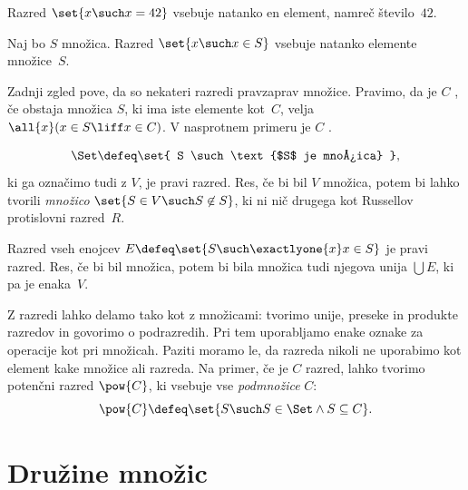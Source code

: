 \begin{zgled}
  Razred $\set{x \such x = 42}$ vsebuje natanko en element, namreč število~$42$.
\end{zgled}

\begin{zgled}
  Naj bo $S$ množica. Razred $\set{x \such x \in S}$ vsebuje natanko elemente množice~$S$.
\end{zgled}

Zadnji zgled pove, da so nekateri razredi pravzaprav množice. Pravimo, da je $C$ , če obstaja množica $S$, ki ima iste elemente kot~$C$, velja $\all{x} (x \in S \liff x \in C)$. V nasprotnem primeru je $C$ .

\begin{zgled}
  \begin{equation*}
    \Set \defeq \set{ S \such \text{$S$ je množica} },
  \end{equation*}
  ki ga označimo tudi z $V$, je pravi razred. Res, če bi bil $V$ množica,
  potem bi lahko tvorili \emph{množico}
  $\set{ S \in V \such S \not\in S}$,
  ki ni nič drugega kot Russellov protislovni razred~$R$.
\end{zgled}

\begin{zgled}
  Razred vseh enojcev $E \defeq \set{ S \such \exactlyone{x} x \in S }$ je pravi razred. Res, če bi bil množica, potem bi bila množica tudi njegova unija $\bigcup E$, ki pa je enaka~$V$.
\end{zgled}

Z razredi lahko delamo tako kot z množicami: tvorimo unije, preseke in produkte
razredov in govorimo o podrazredih. Pri tem uporabljamo enake oznake za
operacije kot pri množicah. Paziti moramo le, da razreda nikoli ne uporabimo kot
element kake množice ali razreda. Na primer, če je $C$ razred, lahko tvorimo
potenčni razred $\pow{C}$, ki vsebuje vse \emph{podmnožice} $C$:
\begin{equation*}
  \pow{C} \defeq \set{ S \such S \in \Set \land S \subseteq C }.
\end{equation*}

\section{Družine množic}

